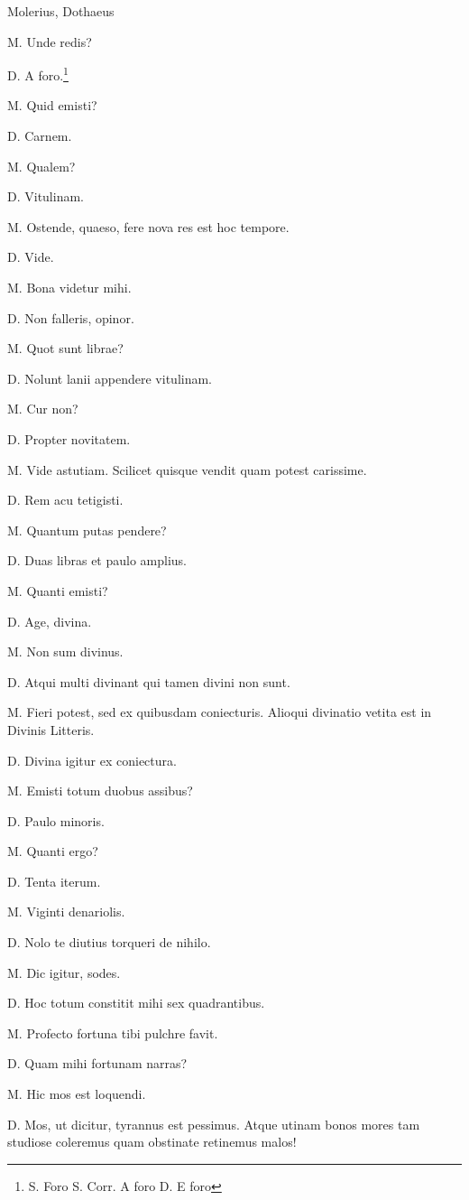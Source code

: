 \documentclass{article}
\begin{document}
Molerius, Dothaeus

M. Unde redis?

D. A foro.\footnote{S. Foro S. Corr. A foro D. E foro}

M. Quid emisti?

D. Carnem.

M. Qualem?

D. Vitulinam.
 
M. Ostende, quaeso, fere nova res est hoc tempore.

D. Vide.

M. Bona videtur mihi.

D. Non falleris, opinor.

M. Quot sunt librae?

D. Nolunt lanii appendere vitulinam.

M. Cur non?

D. Propter novitatem.

M. Vide astutiam. Scilicet quisque vendit quam potest carissime.

D. Rem acu tetigisti.

M. Quantum putas pendere?

D. Duas libras et paulo amplius.

M. Quanti emisti?

D. Age, divina.

M. Non sum divinus.

D. Atqui multi divinant qui tamen divini non sunt.

M. Fieri potest, sed ex quibusdam coniecturis. Alioqui divinatio vetita est in Divinis Litteris.

D. Divina igitur ex coniectura.

M. Emisti totum duobus assibus?

D. Paulo minoris.

M. Quanti ergo?

D. Tenta iterum.

M. Viginti denariolis.

D. Nolo te diutius torqueri de nihilo.

M. Dic igitur, sodes.

D. Hoc totum constitit mihi sex quadrantibus.

M. Profecto fortuna tibi pulchre favit.

D. Quam mihi fortunam narras?

M. Hic mos est loquendi.

D. Mos, ut dicitur, tyrannus est pessimus. Atque utinam bonos mores tam studiose coleremus quam obstinate retinemus malos!
\end{document}
